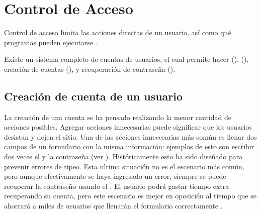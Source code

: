 \section{Control de Acceso}

Control de acceso limita las acciones directas de un usuario, así como qué programas pueden ejecutarse \cite{sandhu1994access}.
 
Existe un sistema completo de cuentas de usuarios, el cual permite hacer \loginCPT(), \logoutCPT(), creación de cuentas (), y recuperación de contraseña (). 

\subsection{Creación de cuenta de un usuario}\label{chapter:solucionimplementada:accounts:subsection:create}

La creación de una cuenta se ha pensado realizando la menor cantidad de acciones posibles. Agregar acciones innecesarias puede significar que los usuarios desistan y dejen el sitio\cite{online_goodgui_org}. Una de las acciones innecesarias más común es llenar dos campos de un formulario con la misma información: ejemplos de esto son escribir dos veces el \email y la contraseña (ver ). Históricamente esto ha sido diseñado para prevenir errores de tipeo. Esta ultima situación no es el escenario más común, pero aunque efectivamente se haya ingresado un error, siempre se puede recuperar la contraseño usando el \email. El usuario podrá gastar tiempo extra recuperando su cuenta, pero este escenario es mejor en oposición al tiempo que se ahorrará a miles de usuarios que llenarán el formulario correctamente \cite{online_atmospherejs_designmodo_usable_registration}. 

